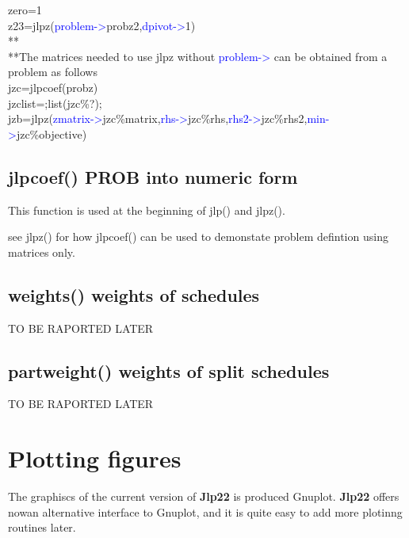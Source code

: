 \begin{example}[jlpzex]
zero=1\\
z23=\textcolor{VioletRed}{jlpz}(\textcolor{blue}{problem->}probz2,\textcolor{blue}{dpivot->}1)\\
**\\
**The matrices needed to use jlpz without \textcolor{blue}{problem->} can be obtained from a problem as follows\\
jzc=\textcolor{VioletRed}{jlpcoef}(probz)\\
jzclist=;list(jzc\%?);\\
jzb=\textcolor{VioletRed}{jlpz}(\textcolor{blue}{zmatrix->}jzc\%matrix,\textcolor{blue}{rhs->}jzc\%rhs,\textcolor{blue}{rhs2->}jzc\%rhs2,\textcolor{blue}{min->}jzc\%objective)
\end{example}
\subsection{ \textcolor{VioletRed}{jlpcoef}() PROB into numeric form}
\label{jlpcoef}
This function is used at the beginning of \textcolor{VioletRed}{jlp}() and \textcolor{VioletRed}{jlpz}().
\begin{note}
see \textcolor{VioletRed}{jlpz}() for how \textcolor{VioletRed}{jlpcoef}() can be used to demonstate problem defintion using matrices only.
\end{note}
\subsection{\textcolor{VioletRed}{weights}() weights of schedules}
\label{weights}
TO BE RAPORTED LATER
\subsection{\textcolor{VioletRed}{partweight}() weights of split schedules}
\label{partweights}
TO BE RAPORTED LATER
\section{Plotting figures}
\label{Plotting}
The graphiscs of the current version of \textbf{Jlp22} is produced Gnuplot. \textbf{Jlp22} offers nowan alternative interface
to Gnuplot, and it is quite easy to add more plotinng routines later.
